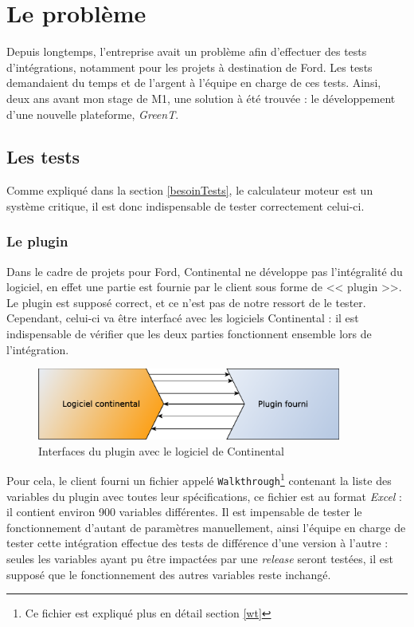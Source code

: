 \chapter{Le problème} \label{chapPb}
\putminitoc
Depuis longtemps, l'entreprise avait un problème afin d'effectuer des tests d'intégrations, notamment pour les projets à destination de Ford. Les tests demandaient du temps et de l'argent à l'équipe en charge de ces tests. Ainsi, deux ans avant mon stage de M1, une solution à été trouvée : le développement d'une nouvelle plateforme, \textit{GreenT}.

\vspace{-32px}
	\section{Les tests} \label{pbTests}
	Comme expliqué dans la section \ref{besoinTests}, le calculateur moteur est un système critique, il est donc indispensable de tester correctement celui-ci.

	\subsection{Le plugin}
	Dans le cadre de projets pour Ford, Continental ne développe pas l'intégralité du logiciel, en effet une partie est fournie par le client sous forme de << plugin >>. Le plugin est supposé correct, et ce n'est pas de notre ressort de le tester. Cependant, celui-ci va être interfacé avec les logiciels Continental : il est indispensable de vérifier que les deux parties fonctionnent ensemble lors de l'intégration.
	\begin{figure}[H]
		\centering
		\includegraphics[width=10cm]{contents/images/plugin.eps}
		\caption{Interfaces du plugin avec le logiciel de Continental}
		\label{fig:plugin}
	\end{figure}

	Pour cela, le client fourni un fichier appelé \texttt{Walkthrough}\footnote{Ce fichier est expliqué plus en détail section \ref{wt}}
	contenant la liste des variables du plugin avec toutes leur spécifications, ce fichier est au format \textit{Excel} : il contient
	environ 900 variables différentes. Il est impensable de tester le fonctionnement d'autant de paramètres manuellement, ainsi l'équipe en
	charge de tester cette intégration effectue des tests de différence d'une version à l'autre : seules les variables ayant pu être
	impactées par une \textit{release} seront testées, il est supposé que le fonctionnement des autres variables reste inchangé.

